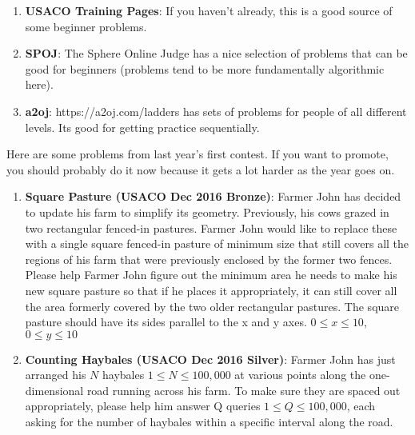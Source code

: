\documentclass{article}
\begin{document}
\begin{enumerate}
    \item \textbf{USACO Training Pages}: If you haven't already, this is a good source of some beginner problems.
    \item \textbf{SPOJ}: The Sphere Online Judge has a nice selection of problems that can be good for beginners (problems tend to be more fundamentally algorithmic here).
    \item \textbf{a2oj}: https://a2oj.com/ladders has sets of problems for people of all different levels. Its good for getting practice sequentially. 
\end{enumerate}

Here are some problems from last year's first contest. If you want to promote, you should probably do it now because it gets a lot harder as the year goes on.

\begin{enumerate}
    \item \textbf{Square Pasture (USACO Dec 2016 Bronze)}: Farmer John has decided to update his farm to simplify its geometry. Previously, his cows grazed in two rectangular fenced-in pastures. Farmer John would like to replace these with a single square fenced-in pasture of minimum size that still covers all the regions of his farm that were previously enclosed by the former two fences. Please help Farmer John figure out the minimum area he needs to make his new square pasture so that if he places it appropriately, it can still cover all the area formerly covered by the two older rectangular pastures. The square pasture should have its sides parallel to the x and y axes. $0 \leq x \leq 10$, $0 \leq y \leq 10$
    \item \textbf{Counting Haybales (USACO Dec 2016 Silver)}: Farmer John has just arranged his $N$ haybales $1 \leq N \leq 100,000$ at various points along the one-dimensional road running across his farm. To make sure they are spaced out appropriately, please help him answer Q queries $1 \leq Q \leq 100,000$, each asking for the number of haybales within a specific interval along the road.

\end{enumerate}
\end{document}
